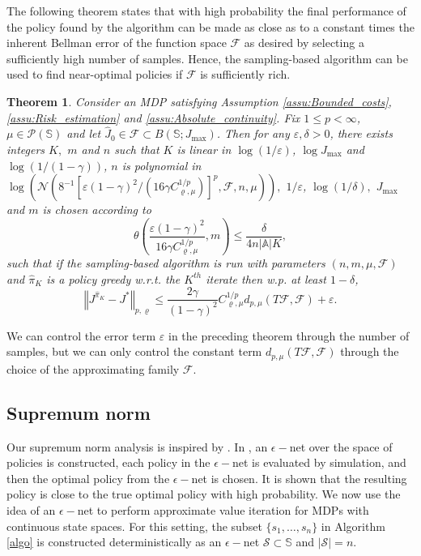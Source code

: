 \documentclass[12pt,technote,onecolumn]{IEEEtran}
\newtheorem{theorem}{Theorem}
\begin{document}
The following theorem states that with high probability the final
performance of the policy found by the algorithm can be made as close
as to a constant times the inherent Bellman error of the function
space $\mathcal{F}$ as desired by selecting
a sufficiently high number of samples. Hence, the sampling-based algorithm
can be used to find near-optimal policies if $\mathcal{F}$
is sufficiently rich.
\begin{theorem}
	\label{thm:PAC bound} Consider an MDP satisfying Assumption \ref{assu:Bounded_costs},
	\ref{assu:Risk_estimation} and \ref{assu:Absolute_continuity}. Fix
	$1\leq p<\infty$, $\mu\in\mathcal{P}\left(\mathbb{S}\right)$ and let $\widehat{J}_{0}\in\mathcal{F}\subset B\left(\mathbb{S};J_{\max}\right)$.
	Then for any $\varepsilon,\delta>0$, there exists integers $K,$
	$m$ and $n$ such that $K$ is linear in $\log\left(1/\varepsilon\right)$,
	$\log J_{\max}$ and $\log\left(1/\left(1-\gamma\right)\right)$,
	$n$ is polynomial in $\log(\mathcal{N}(8^{-1}[\varepsilon(1-\gamma)^{2}/(16\gamma C_{\varrho,\mu}^{1/p})]^{p},\mathcal{F},n,\mu)),$
	$1/\varepsilon$, $\log\left(1/\delta\right),$ $J_{\max}$ and $m$
	is chosen according to $$\theta\left(\frac{\varepsilon\left(1-\gamma\right)^{2}}{16\gamma C_{\varrho,\mu}^{1/p}},m\right)\leq\frac{\delta}{4n\left|\mathbb{A}\right|K},$$
	such that if the sampling-based algorithm is run with parameters $\left(n,m,\mu,\mathcal{F}\right)$
	and $\widehat{\pi}_{K}$ is a policy greedy w.r.t. the $K^{th}$ iterate
	then w.p. at least $1-\delta$,	
	\[
	\left\Vert J^{\widehat{\pi}_{K}}-J^{*}\right\Vert _{p,\varrho}\leq\frac{2\gamma}{\left(1-\gamma\right)^{2}}C_{\varrho,\mu}^{1/p}d_{p,\mu}\left(T\mathcal{F},\mathcal{F}\right)+\varepsilon.
	\]
\end{theorem}

We can control the error term $\varepsilon$ in the preceding theorem
through the number of samples, but we can only control the constant
term $d_{p,\mu}(T\mathcal{F},\mathcal{F})$ through
the choice of the approximating family $\mathcal{F}$. 


\subsection{Supremum norm}\label{sec3.1}

Our supremum norm analysis is inspired by \cite{jain2010simulation}.
In \cite{jain2010simulation}, an $\epsilon-$net
over the space of policies is constructed, each policy in the $\epsilon-$net
is evaluated by simulation, and then the optimal policy from the $\epsilon-$net
is chosen. It is shown that the resulting policy is close to the true
optimal policy with high probability. We now use the idea of an $\epsilon-$net
to perform approximate value iteration for MDPs with continuous state
spaces. For this setting, the subset $\{s_1,\dots,s_n\}$ in Algorithm \ref{algo} is constructed deterministically as an $\epsilon-$net $\mathcal{S}\subset\mathbb{S}$ and $|\mathcal{S}|=n.$
\end{document}
